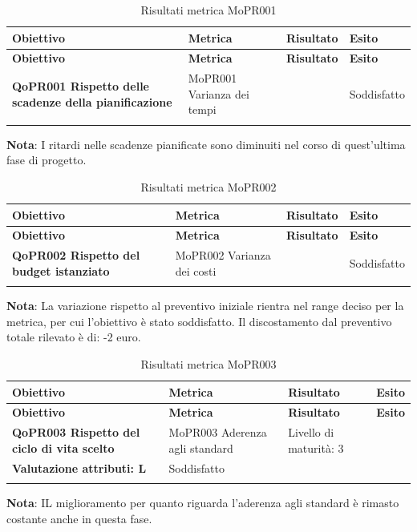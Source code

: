 \renewcommand{\arraystretch}{2} %
\begin{longtable}[H]{>{\centering\bfseries}m{5cm} >{\centering}m{5cm} >{\centering}m{2.5cm} >{\centering\arraybackslash}m{2.5cm}}  
  \rowcolor{lightgray}
  {\textbf{Obiettivo}} & {\textbf{Metrica}} & {\textbf{Risultato}} & {\textbf{Esito}}  \\
  \endfirsthead%
  \rowcolor{lightgray}
  {\textbf{Obiettivo}} & {\textbf{Metrica}} & {\textbf{Risultato}} & {\textbf{Esito}}  \\
  \endhead%
  \textbf{QoPR001 Rispetto delle scadenze della pianificazione} & MoPR001 Varianza dei tempi &  1.02 & Soddisfatto  \\
  \caption{Risultati metrica MoPR001}
  \label{tab:my-table}
\end{longtable}
\textbf{Nota}: I ritardi nelle scadenze pianificate sono diminuiti nel corso di quest'ultima fase di progetto.

\renewcommand{\arraystretch}{2} %
\begin{longtable}[H]{>{\centering\bfseries}m{5cm} >{\centering}m{5cm} >{\centering}m{2.5cm} >{\centering\arraybackslash}m{2.5cm}}  
  \rowcolor{lightgray}
  {\textbf{Obiettivo}} & {\textbf{Metrica}} & {\textbf{Risultato}} & {\textbf{Esito}}  \\
  \endfirsthead%
  \rowcolor{lightgray}
  {\textbf{Obiettivo}} & {\textbf{Metrica}} & {\textbf{Risultato}} & {\textbf{Esito}}  \\
  \endhead%
  \textbf{QoPR002 Rispetto del budget istanziato} & MoPR002 Varianza dei costi & -2 & Soddisfatto  \\
  \caption{Risultati metrica MoPR002}
  \label{tab:my-table}
\end{longtable}
\textbf{Nota}: La variazione rispetto al preventivo iniziale rientra nel range deciso per la metrica, per cui l'obiettivo è stato soddisfatto. Il discostamento dal preventivo totale rilevato è di: -2 euro.

\renewcommand{\arraystretch}{2} %
\begin{longtable}[H]{>{\centering\bfseries}m{5cm} >{\centering}m{5cm} >{\centering}m{2.5cm} >{\centering\arraybackslash}m{2.5cm}}  
  \rowcolor{lightgray}
  {\textbf{Obiettivo}} & {\textbf{Metrica}} & {\textbf{Risultato}} & {\textbf{Esito}}  \\
  \endfirsthead%
  \rowcolor{lightgray}
  {\textbf{Obiettivo}} & {\textbf{Metrica}} & {\textbf{Risultato}} & {\textbf{Esito}}  \\
  \endhead%
  \textbf{QoPR003 Rispetto del ciclo di vita scelto} & MoPR003 Aderenza agli standard & Livello di maturità: 3 \\ Valutazione attributi: L  &  Soddisfatto \\
  \caption{Risultati metrica MoPR003}
  \label{tab:my-table}
\end{longtable}
\textbf{Nota}: IL miglioramento per quanto riguarda l'aderenza agli standard è rimasto costante anche in questa fase.

